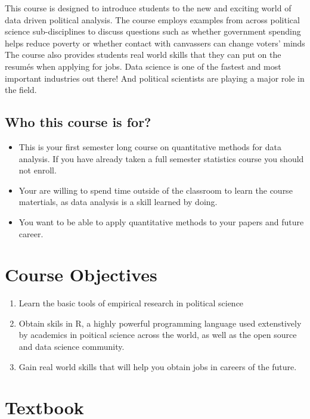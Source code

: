 \documentclass[11pt,]{article}
\begin{document}
This course is designed to introduce students to the new and exciting
world of data driven political analysis. The course employs examples
from across political science sub-disciplines to discuss questions such
as whether government spending helps reduce poverty or whether contact
with canvassers can change voters' minds The course also provides
students real world skills that they can put on the resumés when
applying for jobs. Data science is one of the fastest and most important
industries out there! And political scientists are playing a major role
in the field.

\subsection{Who this course is for?}\label{who-this-course-is-for}

\begin{itemize}
\itemsep1pt\parskip0pt
\item
  This is your first semester long course on quantitative methods for
  data analysis. If you have already taken a full semester statistics
  course you should not enroll.
\item
  Your are willing to spend time outside of the classroom to learn the
  course matertials, as data analysis is a skill learned by doing.
\item
  You want to be able to apply quantitative methods to your papers and
  future career.
\end{itemize}

\section{Course Objectives}\label{course-objectives}

\begin{enumerate}
\def\labelenumi{\arabic{enumi}.}
\item
  Learn the basic tools of empirical research in political science
\item
  Obtain skils in R, a highly powerful programming language used
  extenstively by academics in poitical science across the world, as
  well as the open source and data science community.
\item
  Gain real world skills that will help you obtain jobs in careers of
  the future.
\end{enumerate}

\section{Textbook}\label{textbook}
\end{document}
